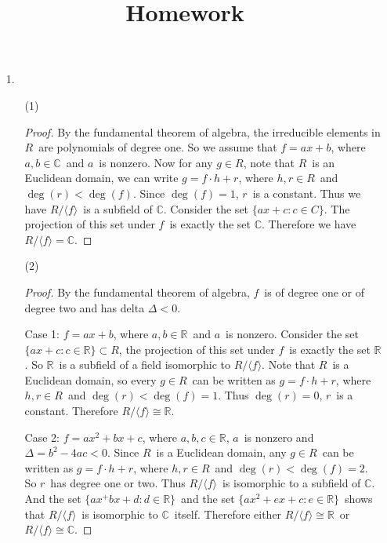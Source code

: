 \documentclass[12pt]{article}
\title{Homework}
\newcommand{\R}{\mathbb{R}}
\newcommand{\C}{\mathbb{C}}
\newcommand\Myperm[2][^n]{\prescript{#1\mkern-2.5mu}{}P_{#2}}
\newcommand\Mycomb[2][^n]{\prescript{#1\mkern-0.5mu}{}C_{#2}}
\newcommand{\la}{\langle}
\newcommand{\ra}{\rangle}
\begin{document}
	




\begin{enumerate}
	\item[1.]
	\begin{enumerate}
		\item[(1)]
		\begin{proof}
		    By the fundamental theorem of algebra, the irreducible elements in $R$\ are polynomials of degree one. So we assume that $f=ax+b$, where $a,b\in\C$\ and $a$\ is nonzero. Now for any $g\in R$, note that $R$\ is an Euclidean domain, we can write $g=f\cdot h+r$, where $h,r\in R$\ and $\deg(r)<\deg(f)$. Since $\deg(f)=1$, $r$\ is a constant. Thus we have $R/\la f\ra$\ is a subfield of $\C$. Consider the set $\{ax+c:c\in C\}$. The projection of this set under $f$\ is exactly the set $\C$. Therefore we have $R/\la f\ra=\C$.
		\end{proof}
		\item[(2)]
		\begin{proof}
		    By the fundamental theorem of algebra, $f$\ is of degree one or of degree two and has delta $\Delta<0$.\par
		    \quad Case 1: $f=ax+b$, where $a,b\in\R$\ and $a$\ is nonzero. Consider the set $\{ax+c:c\in\R\}\subset R$, the projection of this set under $f$\ is exactly the set $\R$. So $\R$\ is a subfield of a field isomorphic to $R/\la f\ra$. Note that $R$\ is a Euclidean domain, so every $g\in R$\ can be written as $g=f\cdot h+r$, where $h,r\in R$\ and $\deg(r)<\deg(f)=1$. Thus $\deg(r)=0$, $r$\ is a constant. Therefore $R/\la f\ra\cong\R$.\par
		    \quad Case 2: $f=ax^2+bx+c$, where $a,b,c\in\R$, $a$\ is nonzero and $\Delta=b^2-4ac<0$. Since $R$\ is a Euclidean domain, any $g\in R$\ can be written as $g=f\cdot h+r$, where $h,r\in R$\ and $\deg(r)<\deg(f)=2$. So $r$\ has degree one or two. Thus $R/\la f\ra$\ is isomorphic to a subfield of $\C$. And the set $\{ax^+bx+d:d\in\R\}$\ and the set $\{ax^2+ex+c:e\in\R\}$\ shows that $R/\la f\ra$\ is isomorphic to $\C$\ itself. Therefore either $R/\la f\ra\cong\R$\ or $R/\la f\ra\cong\C$.

\end{proof}
\end{enumerate}
\end{enumerate}
\end{document}
